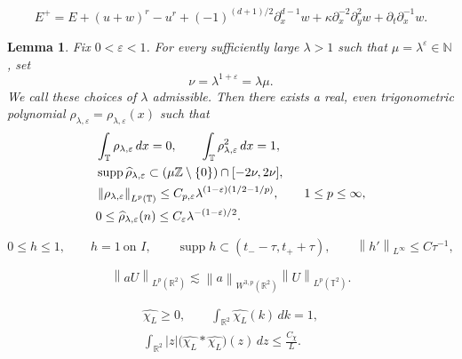 \documentclass[10pt,a4paper]{amsart}
\newtheorem{lemma}{Lemma}
\newcommand{\R}{\mathbb R}
\newcommand{\T}{\mathbb T}
\newcommand{\Z}{\mathbb Z}
\newcommand{\abs}[1]{\left\lvert #1\right\rvert}
\newcommand{\eps}{\varepsilon}
\newcommand{\la}{\lambda}
\newcommand{\norm}[1]{\left\lVert #1\right\rVert}
\newcommand{\supp}{\operatorname{supp}}
\begin{document}
\begin{equation}\label{eq:Euclidean-update-general}
 E^+=E+(u+w)^r-u^r+(-1)^{(d+1)/2}\partial_x^{d-1}w
 +\kappa\partial_x^{-2}\partial_y^2w
 +\partial_t\partial_x^{-1}w.
\end{equation}

\begin{lemma}\label{lem:slab}
Fix $0<\eps<1$.  For every sufficiently large
$\la>1$ such that $\mu=\la^\eps\in\mathbb N$, set
\begin{equation*}
 \nu=\la^{1+\eps}=\la\mu.
\end{equation*}
We call these choices of $\la$ admissible.
Then there exists a real, even trigonometric polynomial
$\rho_{\la,\eps}=\rho_{\la,\eps}(x)$ such that
\begin{align}
 &\int_\T\rho_{\la,\eps}\,dx=0,
 \qquad \int_\T\rho_{\la,\eps}^2\,dx=1,
 \label{eq:slabmoments}\\
 &\supp\widehat\rho_{\la,\eps}
 \subset(\mu\Z\setminus\{0\})\cap[-2\nu,2\nu],
 \notag\\
 &\norm{\rho_{\la,\eps}}_{L^p(\T)}
 \leq C_{p,\eps}\la^{(1-\eps)(1/2-1/p)},
 \qquad1\leq p\leq\infty,
 \label{eq:slabLp}\\
 &0\leq\widehat\rho_{\la,\eps}(n)
 \leq C_\eps\la^{-(1-\eps)/2}.
 \label{eq:slab-coefficient-bound}
\end{align}
\end{lemma}

\begin{equation}\label{eq:time-cutoff-lemma}
   0\leq h\leq1,
   \qquad h=1\ \text{on }I,
   \qquad \supp h\subset(t_--\tau,t_++\tau),
   \qquad \norm{h'}_{L^\infty}\leq C\tau^{-1},
\end{equation}

\begin{equation}\label{eq:Euclidean-periodic-decoupling}
    \norm{aU}_{L^p(\R^2)}
    \lesssim
    \norm{a}_{W^{3,p}(\R^2)}
    \norm{U}_{L^p(\T^2)}.
\end{equation}

\begin{equation}\label{eq:Euclidean-spatial-cutoff-moment}
\begin{gathered}
   \widehat{\chi_L}\geq0,
   \qquad
   \int_{\R^2}\widehat{\chi_L}(k)\,dk=1,\\
   \int_{\R^2}\abs z
      \bigl(\widehat{\chi_L}*\widehat{\chi_L}\bigr)(z)\,dz
      \leq\frac{C_\chi}{L}.
\end{gathered}
\end{equation}
\end{document}

